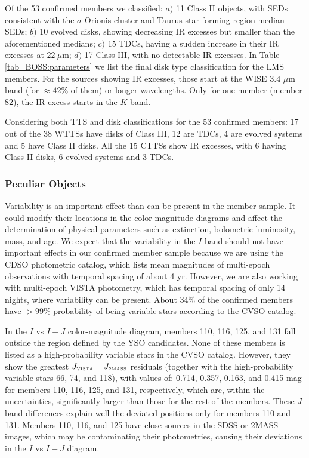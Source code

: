 \documentclass[12pt]{article}
\newcounter{subsubsubsection}[subsubsection]
\begin{document}
Of the 53 confirmed members we classified: $a)$ 11 Class II objects, with SEDs consistent with the $\sigma$ Orionis cluster and Taurus star-forming region median SEDs; $b)$ 10 evolved disks, showing decreasing IR excesses but smaller than the aforementioned medians; $c)$ 15 TDCs, having a sudden increase in their IR excesses at $22\ \mu$m; $d)$ 17 Class III, with no detectable IR excesses. In Table \ref{tab_BOSS:parameters} we list the final disk type classification for the LMS members. For the sources showing IR excesses, those start at the WISE 3.4 $\mu$m band (for $\approx 42$\% of them) or longer wavelengths. Only for one member (member 82), the IR excess starts in the $K$ band.

Considering both TTS and disk classifications for the 53 confirmed members: 17 out of the 38 WTTSs have disks of Class III, 12 are TDCs, 4 are evolved systems and 5 have Class II disks. All the 15 CTTSs show IR excesses, with 6 having Class II disks, 6 evolved systems and 3 TDCs.

\subsubsection{Peculiar Objects}
\label{sec_BOSS:singular}


Variability is an important effect than can be present in the member sample. It could modify their locations in the color-magnitude diagrams and affect the determination of physical parameters such as extinction, bolometric luminosity, mass, and age. We expect that the variability in the $I$ band should not have important effects in our confirmed member sample because we are using the CDSO photometric catalog, which lists mean magnitudes of multi-epoch observations with temporal spacing of about 4 yr. However, we are also working with multi-epoch VISTA photometry, which has temporal spacing of only 14 nights, where variability can be present. About $34\%$ of the confirmed members have $>99\%$ probability of being variable stars according to the CVSO catalog.

In the $I$ vs $I-J$ color-magnitude diagram, members 110, 116, 125, and 131 fall outside the region defined by the YSO candidates. None of these members is listed as a high-probability variable stars in the CVSO catalog. However, they show the greatest $J_\textrm{\tiny {VISTA}}-J_\textrm{\tiny {2MASS}}$ residuals (together with the high-probability variable stars 66, 74, and 118), with values of: 0.714, 0.357, 0.163, and 0.415 mag for members 110, 116, 125, and 131, respectively, which are, within the uncertainties, significantly larger than those for the rest of the members. These $J$-band differences explain well the deviated positions only for members 110 and 131. Members 110, 116, and 125 have close sources in the SDSS or 2MASS images, which may be contaminating their photometries, causing their deviations in the $I$ vs $I-J$ diagram.
\end{document}
